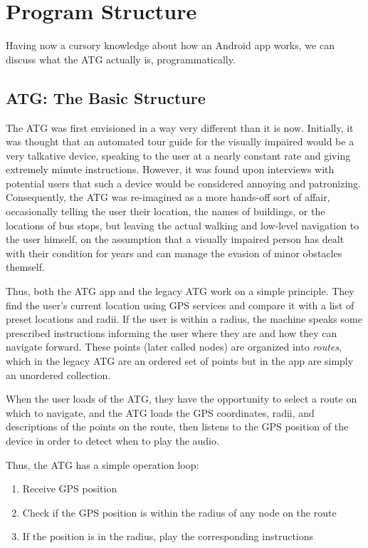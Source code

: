 \section{Program Structure}

Having now a cursory knowledge about how an Android app works, we can discuss what the ATG actually is, programmatically.
\subsection{ATG: The Basic Structure}
The ATG was first envisioned in a way very different than it is now. Initially, it was thought that an automated tour guide for the visually
impaired would be a very talkative device, speaking to the user at a nearly constant rate and giving extremely minute instructions. However,
it was found upon interviews with potential users that such a device would be considered annoying and patronizing. Consequently, the ATG was
re-imagined as a more hands-off sort of affair, occasionally telling the user their location, the names of buildings, or the locations of
bus stops, but leaving the actual walking and low-level navigation to the user himself, on the assumption that a visually impaired person has
dealt with their condition for years and can manage the evasion of minor obstacles themself.

Thus, both the ATG app and the legacy ATG work on a simple principle. They find the user's current location using GPS services and compare it
with a list of preset locations and radii. If the user is within a radius, the machine speaks some prescribed instructions informing
the user where they are and how they can navigate forward. These points (later called nodes) are organized into \emph{routes}, which in the 
legacy ATG are an ordered set of points but in the app are simply an unordered collection. 

When the user loads of the ATG, they have the opportunity to select a route on which to navigate, and the ATG loads the GPS coordinates, 
radii, and descriptions of the points on the route, then listens to the GPS position of the device in order to detect when to play the audio.

Thus, the ATG has a simple operation loop:

\begin{enumerate}
\item{Receive GPS position}
\item{Check if the GPS position is within the radius of any node on the route}
\item{If the position is in the radius, play the corresponding instructions}
\end{enumerate}
